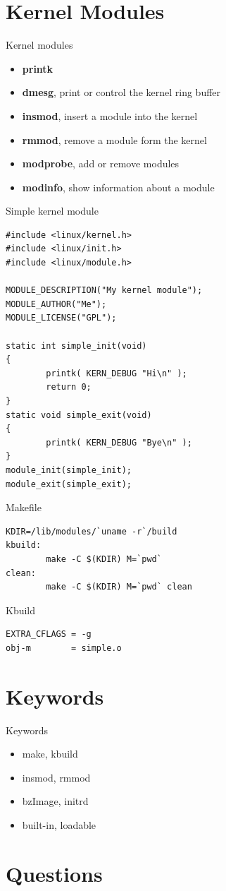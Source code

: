 \documentclass{workshop}
\begin{document}
\section{Kernel Modules}


\begin{frame}{Kernel modules}

\begin{itemize}
	\item {\bf printk}
	\item {\bf dmesg}, print or control the kernel ring buffer
	\item {\bf insmod}, insert a module into the kernel
	\item {\bf rmmod}, remove a module form the kernel
	\item {\bf modprobe}, add or remove modules
	\item {\bf modinfo}, show information about a module
\end{itemize}
\end{frame}

\begin{frame}[fragile]{Simple kernel module}
\begin{verbatim}#include <linux/kernel.h>
#include <linux/init.h>
#include <linux/module.h>

MODULE_DESCRIPTION("My kernel module");
MODULE_AUTHOR("Me");
MODULE_LICENSE("GPL");

static int simple_init(void)
{
        printk( KERN_DEBUG "Hi\n" );
        return 0;
}
static void simple_exit(void)
{
        printk( KERN_DEBUG "Bye\n" );
}
module_init(simple_init);
module_exit(simple_exit);                          
\end{verbatim}
\end{frame}

\begin{frame}[fragile]{Makefile}
\begin{verbatim}
KDIR=/lib/modules/`uname -r`/build
kbuild:
        make -C $(KDIR) M=`pwd`
clean:
        make -C $(KDIR) M=`pwd` clean
\end{verbatim}
\end{frame}




\begin{frame}[fragile]{Kbuild}
\begin{verbatim}
EXTRA_CFLAGS = -g
obj-m        = simple.o
\end{verbatim}
\end{frame}




\section{Keywords}

\begin{frame}{Keywords}
      \begin{itemize}
        \item make, kbuild
	\item insmod, rmmod
	\item bzImage, initrd
	\item built-in, loadable
      \end{itemize}
\end{frame}

\section{Questions}
\end{document}
